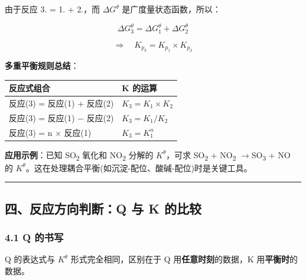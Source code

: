 \documentclass[a4paper,11pt]{ctexart}
\newcounter{none}
\newcommand{\箭}{\ensuremath{\rightarrow}}
\newcommand{\左箭}{\ensuremath{\leftarrow}}
\newcommand{\上箭}{\ensuremath{\uparrow}}
\newcommand{\下箭}{\ensuremath{\downarrow}}
\newcommand{\衡}{\ensuremath{\rightleftharpoons}}
\newcommand{\双箭}{\ensuremath{\leftrightarrow}}
\newcommand{\约等于}{\ensuremath{\approx}}
\newcommand{\小于等于}{\ensuremath{\leq}}
\newcommand{\大于等于}{\ensuremath{\geq}}
\newcommand{\不等于}{\ensuremath{\neq}}
\newcommand{\西格马}{\ensuremath{\sigma}}
\newcommand{\派}{\ensuremath{\pi}}
\begin{document}
由于反应 3. = 1. + 2.，而 \(\Delta G^\theta\) 是广度量状态函数，所以：

\[
\Delta G_3^\theta = \Delta G_1^\theta + \Delta G_2^\theta
\]

\[
\Rightarrow \quad \boxed{K_{p_3} = K_{p_1} \times K_{p_2}}
\]

\textbf{多重平衡规则总结}：

{\def\LTcaptype{none} %
\begin{longtable}[]{@{}ll@{}}
\toprule\noalign{}
反应式组合 & K 的运算 \\
\midrule\noalign{}
\endhead
\bottomrule\noalign{}
\endlastfoot
反应(3) = 反应(1) + 反应(2) & \(K_3 = K_1 \times K_2\) \\
反应(3) = 反应(1) − 反应(2) & \(K_3 = K_1 / K_2\) \\
反应(3) = n × 反应(1) & \(K_3 = K_1^n\) \\
\end{longtable}
}

\textbf{应用示例}：已知 SO\textsubscript{2} 氧化和 NO\textsubscript{2} 分解的 \(K^\theta\)，可求 SO\textsubscript{2} + NO\textsubscript{2} \箭 SO\textsubscript{3} + NO 的 \(K^\theta\)。这在处理耦合平衡(如沉淀-配位、酸碱-配位)时是关键工具。

\begin{center}\rule{0.5\linewidth}{0.5pt}\end{center}

\subsection{四、反应方向判断：Q 与 K 的比较}\label{ux56dbux53cdux5e94ux65b9ux5411ux5224ux65adq-ux4e0e-k-ux7684ux6bd4ux8f83}

\subsubsection{4.1 Q 的书写}\label{q-ux7684ux4e66ux5199}

Q 的表达式与 \(K^\theta\) 形式完全相同，区别在于 Q 用\textbf{任意时刻}的数据，K 用\textbf{平衡时}的数据。
\end{document}

